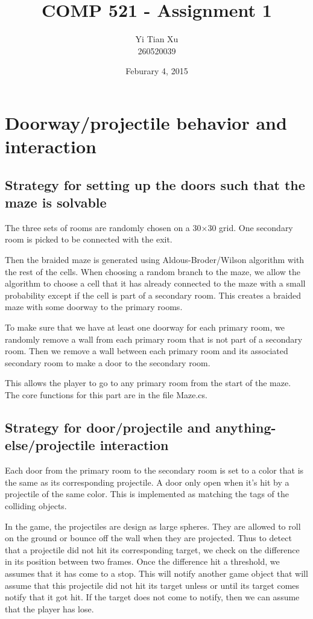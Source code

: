 \documentclass[13pt]{article}
\title{COMP 521 - Assignment 1}
\author{Yi Tian Xu\\260520039}
\date{Feburary 4, 2015}
\begin{document}
\maketitle
\section{Doorway/projectile behavior and interaction}

\subsection{Strategy for setting up the doors such that the maze is solvable}
The three sets of rooms are randomly chosen on a 30$\times$30 grid. One secondary room is picked to be connected with the exit. 

Then the braided maze is generated using Aldous-Broder/Wilson algorithm with the rest of the cells. When choosing a random branch to the maze, we allow the algorithm to choose a cell that it has already connected to the maze with a small probability except if the cell is part of a secondary room. This creates a braided maze with some doorway to the primary rooms.

To make sure that we have at least one doorway for each primary room, we randomly remove a wall from each primary room that is not part of a secondary room. Then we remove a wall between each primary room and its associated secondary room to make a door to the secondary room.

This allows the player to go to any primary room from the start of the maze. \\

The core functions for this part are in the file Maze.cs.

\subsection{Strategy for door/projectile and  anything-else/projectile interaction}
Each door from the primary room to the secondary room is set to a color that is the same as its corresponding projectile. A door only open when it's hit by a projectile of the same color. This is implemented as matching the tags of the colliding objects. 

In the game, the projectiles are design as large spheres. They are allowed to roll on the ground or bounce off the wall when they are projected. Thus to detect that a projectile did not hit its corresponding target, we check on the difference in its position between two frames. Once the difference hit a threshold, we assumes that it has come to a stop. This will notify another game object that will assume that this projectile did not hit its target unless or until its target comes notify that it got hit. If the target does not come to notify, then we can assume that the player has lose. 
\end{document}
